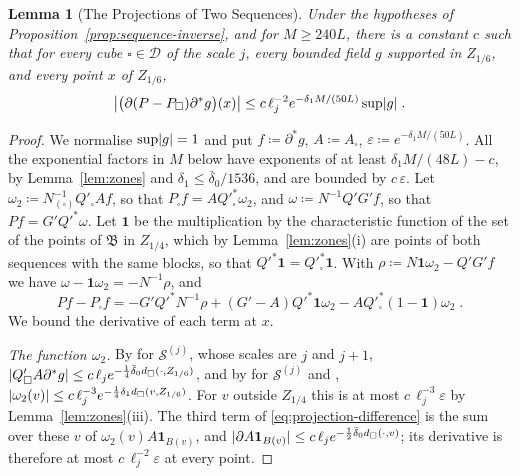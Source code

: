 \documentclass[11pt]{preprint}
\DeclarePairedDelimiter{\abs}{\lvert}{\rvert}
\numberwithin{equation}{section}
\newtheorem{lemma}[theorem]{Lemma}
\theoremstyle{definition}
\theoremstyle{remark}
\theoremstyle{plain}
\begin{document}
\begin{lemma}[The Projections of Two Sequences]\label{lem:projection-locality}
Under the hypotheses of Proposition~\ref{prop:sequence-inverse}, and for $M \geq 240L$, there is a constant $c$ such that for every cube $\square \in \mathscr D$ of the scale $j$, every bounded field $g$ supported in $Z_{1/6}$, and every point $x$ of $Z_{1/6}$,
\begin{equation}\label{eq:projection-locality}
    \bigl\lvert\bigl(\partial(P - P_\square)\partial^*g\bigr)(x)\bigr\rvert \leq c\,\ell_j^{-2}e^{-\delta_1M/(50L)}\sup\abs g\;.
\end{equation}
\end{lemma}

\begin{proof}
We normalise $\sup\abs g = 1$ and put $f \coloneqq \partial^*g$, $A \coloneqq A_\square$, $\varepsilon \coloneqq e^{-\delta_1M/(50L)}$. All the exponential factors in $M$ below have exponents of at least $\delta_1M/(48L) - c$, by Lemma~\ref{lem:zones} and $\delta_1 \leq \bar\delta_0/1536$, and are bounded by $c\,\varepsilon$. Let $\omega_2 \coloneqq N_{(\square)}^{-1}Q'_\square Af$, so that $P_\square f = AQ'^*_\square\omega_2$, and $\omega \coloneqq N^{-1}Q'G'f$, so that $Pf = G'Q'^*\omega$. Let $\mathbf 1$ be the multiplication by the characteristic function of the set of the points of $\mathfrak B$ in $Z_{1/4}$, which by Lemma~\ref{lem:zones}(i) are points of both sequences with the same blocks, so that $Q'^*\mathbf 1 = Q'^*_\square\mathbf 1$. With $\rho \coloneqq N\mathbf 1\omega_2 - Q'G'f$ we have $\omega - \mathbf 1\omega_2 = -N^{-1}\rho$, and
\begin{equation}\label{eq:projection-difference}
    Pf - P_\square f = -G'Q'^*N^{-1}\rho + (G' - A)Q'^*\mathbf 1\omega_2 - AQ'^*_\square(1 - \mathbf 1)\omega_2\;.
\end{equation}
We bound the derivative of each term at $x$.

\emph{The function $\omega_2$.} By \cite[(2.67)]{BalabanPRT2} for $\mathcal S^{(j)}$, whose scales are $j$ and $j + 1$, $\abs{Q'_\square A\partial^*g} \leq c\,\ell_je^{-\frac14\bar\delta_0d_\square(\cdot, Z_{1/6})}$, and by \cite[(2.87)]{BalabanPRT2} for $\mathcal S^{(j)}$ and \cite[(2.61)]{BalabanPRT2}, $\abs{\omega_2(v)} \leq c\,\ell_j^{-3}e^{-\frac14\delta_1d_\square(v, Z_{1/6})}$. For $v$ outside $Z_{1/4}$ this is at most $c\,\ell_j^{-3}\varepsilon$ by Lemma~\ref{lem:zones}(iii). The third term of \eqref{eq:projection-difference} is the sum over these $v$ of $\omega_2(v)A\mathbf 1_{B(v)}$, and $\abs{\partial A\mathbf 1_{B(v)}} \leq c\,\ell_je^{-\frac12\bar\delta_0d_\square(\cdot, v)}$; its derivative is therefore at most $c\,\ell_j^{-2}\varepsilon$ at every point.


\end{proof}
\end{document}
